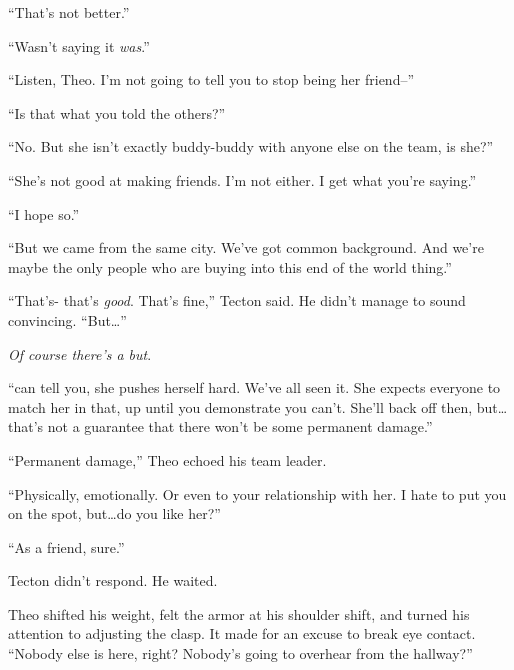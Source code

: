 ``That's not better.''



``Wasn't saying it \emph{was}.''



``Listen, Theo.  I'm not going to tell you to stop being her friend--''



``Is that what you told the others?''



``No.  But she isn't exactly buddy-buddy with anyone else on the team, is she?''



``She's not good at making friends.  I'm not either.  I get what you're saying.''



``I hope so.''



``But we came from the same city.  We've got common background.  And we're maybe the only people who are buying into this end of the world thing.''



``That's- that's \emph{good}.  That's fine,'' Tecton said.  He didn't manage to sound convincing.  ``But\ldots''



\emph{Of course there's a but}.



``\ldotsI can tell you, she pushes herself hard.  We've all seen it.  She expects everyone to match her in that, up until you demonstrate you can't.  She'll back off then, but\ldots that's not a guarantee that there won't be some permanent damage.''



``Permanent damage,'' Theo echoed his team leader.



``Physically, emotionally.  Or even to your relationship with her.  I hate to put you on the spot, but\ldots do you like her?''



``As a friend, sure.''



Tecton didn't respond.  He waited.



Theo shifted his weight, felt the armor at his shoulder shift, and turned his attention to adjusting the clasp.  It made for an excuse to break eye contact.  ``Nobody else is here, right?  Nobody's going to overhear from the hallway?''



